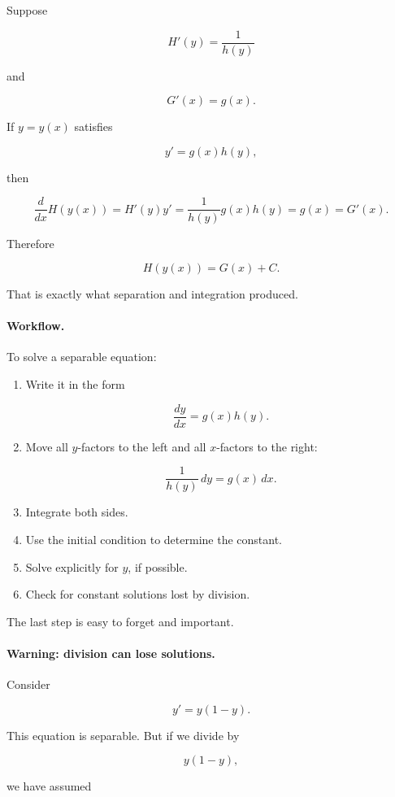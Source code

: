Suppose

\[
H'(y)=\frac{1}{h(y)}
\]

and

\[
G'(x)=g(x).
\]

If \(y=y(x)\) satisfies

\[
y'=g(x)h(y),
\]

then

\[
\frac{d}{dx}H(y(x))
=
H'(y)y'
=
\frac{1}{h(y)}g(x)h(y)
=
g(x)
=
G'(x).
\]

Therefore

\[
H(y(x))=G(x)+C.
\]

That is exactly what separation and integration produced.

\paragraph{Workflow.}
To solve a separable equation:

\begin{enumerate}
\item Write it in the form

\[
\frac{dy}{dx}=g(x)h(y).
\]

\item Move all \(y\)-factors to the left and all \(x\)-factors to the right:

\[
\frac{1}{h(y)}\,dy=g(x)\,dx.
\]

\item Integrate both sides.

\item Use the initial condition to determine the constant.

\item Solve explicitly for \(y\), if possible.

\item Check for constant solutions lost by division.
\end{enumerate}

The last step is easy to forget and important.

\paragraph{Warning: division can lose solutions.}
Consider

\[
y'=y(1-y).
\]

This equation is separable.  But if we divide by

\[
y(1-y),
\]

we have assumed

